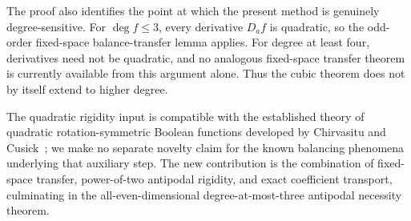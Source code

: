 \documentclass[11pt,a4paper]{article}
\theoremstyle{remark}
\theoremstyle{plain}
\begin{document}
The proof also identifies the point at which the present method is genuinely degree-sensitive. For $\deg f\le3$, every derivative $D_af$ is quadratic, so the odd-order fixed-space balance-transfer lemma applies. For degree at least four, derivatives need not be quadratic, and no analogous fixed-space transfer theorem is currently available from this argument alone. Thus the cubic theorem does not by itself extend to higher degree.

The quadratic rigidity input is compatible with the established theory of quadratic rotation-symmetric Boolean functions developed by Chirvasitu and Cusick~\cite{chircusick}; we make no separate novelty claim for the known balancing phenomena underlying that auxiliary step. The new contribution is the combination of fixed-space transfer, power-of-two antipodal rigidity, and exact coefficient transport, culminating in the all-even-dimensional degree-at-most-three antipodal necessity theorem.
\end{document}
